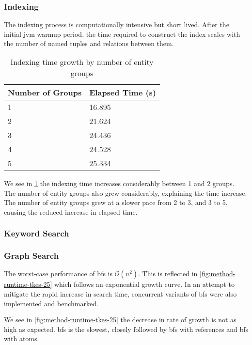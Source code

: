 			\subsubsection{Indexing}
				The indexing process is computationally intensive but short lived.  After the initial \gls{jvm} warmup period, the time required to construct the index scales with the number of named tuples and relations between them.
				
				\begin{table}[H]
					\centering
					\begin{tabular}{ll}
						\toprule
						Number of Groups & Elapsed Time (s) \\
						\midrule
						1 & 16.895 \\
						2 & 21.624 \\
						3 & 24.436 \\
						4 & 24.528 \\
						5 & 25.334 \\
						\bottomrule
					\end{tabular}
					
					\caption{Indexing time growth by number of entity groups}
					\label{tbl:index-growth-entity-groups}
				\end{table}
				
				We see in \cref{tbl:index-growth-entity-groups} the indexing time increases considerably between 1 and 2 groups.  The number of entity groups also grew considerably, explaining the time increase.  The number of entity groups grew at a slower pace from 2 to 3, and 3 to 5, causing the reduced increase in elapsed time.
				
			\subsubsection{Keyword Search}
			
			
			\subsubsection{Graph Search}
				The worst-case performance of \gls{bfs} is \(\mathcal{O}(n^2)\).  This is reflected in \cref{fig:method-runtime-tkes-25} which follows an exponential growth curve.  In an attempt to mitigate the rapid increase in search time, concurrent variants of \gls{bfs} were also implemented and benchmarked.
				
				We see in \cref{fig:method-runtime-tkes-25} the decrease in rate of growth is not as high as expected.  \gls{bfs} is the slowest, closely followed by \gls{bfs} with references and \gls{bfs} with atoms.
				
